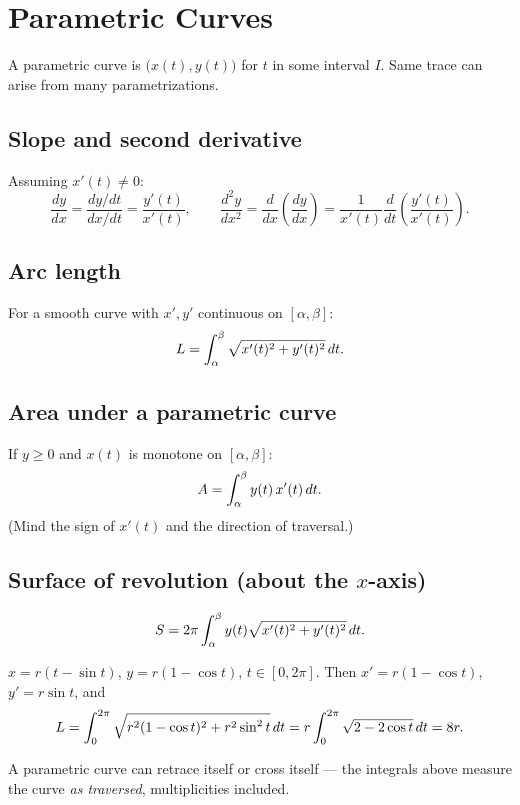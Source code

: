 \section{Parametric Curves}

A parametric curve is $\bigl(x(t), y(t)\bigr)$ for $t$ in some interval $I$. Same trace can
arise from many parametrizations.

\subsection{Slope and second derivative}
Assuming $x'(t) \neq 0$:
\[
\frac{dy}{dx} = \frac{dy/dt}{dx/dt} = \frac{y'(t)}{x'(t)},
\qquad
\frac{d^2 y}{dx^2} = \frac{d}{dx}\!\left(\frac{dy}{dx}\right)
= \frac{1}{x'(t)} \frac{d}{dt}\!\left(\frac{y'(t)}{x'(t)}\right).
\]

\subsection{Arc length}
For a smooth curve with $x', y'$ continuous on $[\alpha, \beta]$:
\[ L = \int_\alpha^\beta \sqrt{x'(t)^2 + y'(t)^2} \,dt. \]

\subsection{Area under a parametric curve}
If $y \ge 0$ and $x(t)$ is monotone on $[\alpha, \beta]$:
\[ A = \int_\alpha^\beta y(t) \, x'(t) \,dt. \]
(Mind the sign of $x'(t)$ and the direction of traversal.)

\subsection{Surface of revolution (about the $x$-axis)}
\[ S = 2\pi \int_\alpha^\beta y(t) \sqrt{x'(t)^2 + y'(t)^2} \,dt. \]

\begin{example}[Cycloid]
$x = r(t - \sin t)$, $y = r(1 - \cos t)$, $t \in [0, 2\pi]$.
Then $x' = r(1 - \cos t)$, $y' = r \sin t$, and
\[ L = \int_0^{2\pi} \sqrt{r^2 (1 - \cos t)^2 + r^2 \sin^2 t} \,dt
= r \int_0^{2\pi} \sqrt{2 - 2 \cos t} \,dt = 8r. \]
\end{example}

\begin{pitfallbox}
A parametric curve can retrace itself or cross itself --- the integrals above measure the curve
\emph{as traversed}, multiplicities included.
\end{pitfallbox}
